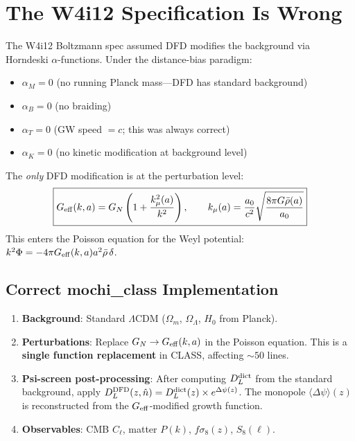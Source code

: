 \documentclass[11pt]{article}
\newcommand{\LCDM}{$\Lambda$CDM}
\newcommand{\Geff}{G_{\rm eff}}
\newcommand{\Dpsi}{\Delta\psi}
\begin{document}
\section{The W4i12 Specification Is Wrong}

The W4i12 Boltzmann spec assumed DFD modifies the background via
Horndeski $\alpha$-functions.  Under the distance-bias paradigm:

\begin{itemize}[nosep]
\item $\alpha_M = 0$ (no running Planck mass---DFD has standard
  background)
\item $\alpha_B = 0$ (no braiding)
\item $\alpha_T = 0$ (GW speed $= c$; this was always correct)
\item $\alpha_K = 0$ (no kinetic modification at background level)
\end{itemize}

The \emph{only} DFD modification is at the perturbation level:
\begin{equation}
\boxed{
\Geff(k,a) = G_N\left(1 + \frac{k_\mu^2(a)}{k^2}\right),
\qquad k_\mu(a) = \frac{a_0}{c^2}\sqrt{\frac{8\pi G\bar\rho(a)}{a_0}}
}
\end{equation}
This enters the Poisson equation for the Weyl potential:
$k^2\Phi = -4\pi \Geff(k,a) a^2 \bar\rho\,\delta$.

\subsection{Correct mochi\_class Implementation}

\begin{enumerate}[nosep]
\item \textbf{Background}: Standard \LCDM{} ($\Omega_m$, $\Omega_\Lambda$,
  $H_0$ from Planck).
\item \textbf{Perturbations}: Replace $G_N \to \Geff(k,a)$ in the
  Poisson equation.  This is a \textbf{single function replacement}
  in CLASS, affecting $\sim 50$ lines.
\item \textbf{Psi-screen post-processing}: After computing $D_L^{\rm dict}$
  from the standard background, apply $D_L^{\rm DFD}(z,\hat n) =
  D_L^{\rm dict}(z) \times e^{\Dpsi(z)}$.  The monopole $\langle\Dpsi\rangle(z)$
  is reconstructed from the $\Geff$-modified growth function.
\item \textbf{Observables}: CMB $C_\ell$, matter $P(k)$, $f\sigma_8(z)$,
  $S_8(\ell)$.
\end{enumerate}
\end{document}
